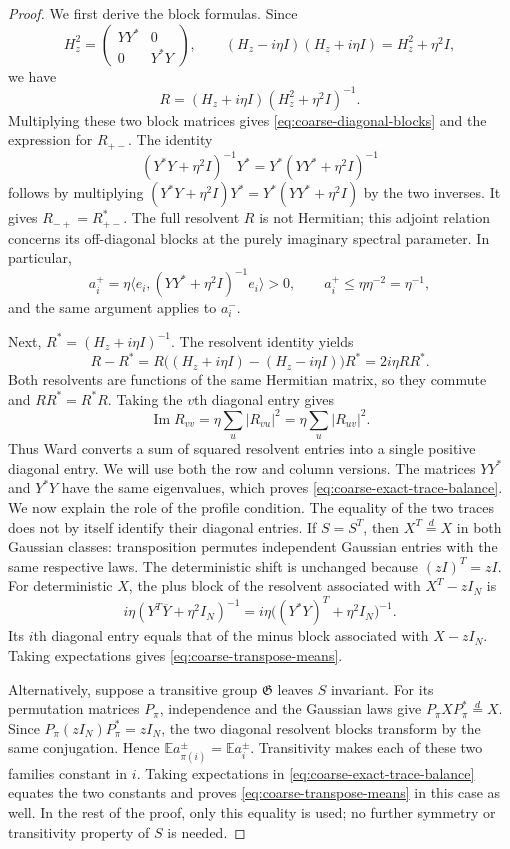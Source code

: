 \documentclass[11pt,reqno]{amsart}
\numberwithin{equation}{section}
\theoremstyle{plain}
\theoremstyle{definition}
\theoremstyle{remark}
\begin{document}
\begin{proof}
We first derive the block formulas. Since
\[
 H_z^2=\begin{pmatrix}YY^*&0\\0&Y^*Y\end{pmatrix},
 \qquad
 (H_z-i\eta I)(H_z+i\eta I)=H_z^2+\eta^2I,
\]
we have
\[
 R=(H_z+i\eta I)(H_z^2+\eta^2I)^{-1}.
\]
Multiplying these two block matrices gives
\eqref{eq:coarse-diagonal-blocks} and the expression for $R_{+-}$.
The identity
\[
 (Y^*Y+\eta^2I)^{-1}Y^*=Y^*(YY^*+\eta^2I)^{-1}
\]
follows by multiplying $(Y^*Y+\eta^2I)Y^*=Y^*(YY^*+\eta^2I)$
by the two inverses. It gives $R_{-+}=R_{+-}^*$.
The full resolvent $R$ is not Hermitian; this adjoint relation concerns
its off-diagonal blocks at the purely imaginary spectral parameter.
In particular,
\[
 a_i^+=\eta\langle e_i,(YY^*+\eta^2I)^{-1}e_i\rangle>0,
 \qquad a_i^+\le\eta\eta^{-2}=\eta^{-1},
\]
and the same argument applies to $a_i^-$.

Next, $R^*=(H_z+i\eta I)^{-1}$. The resolvent identity yields
\[
 R-R^*=R\bigl((H_z+i\eta I)-(H_z-i\eta I)\bigr)R^*
       =2i\eta RR^*.
\]
Both resolvents are functions of the same Hermitian matrix, so they
commute and $RR^*=R^*R$. Taking the $v$th diagonal entry gives
\[
 \operatorname{Im}R_{vv}
 =\eta\sum_u|R_{vu}|^2
 =\eta\sum_u|R_{uv}|^2.
\]
Thus Ward converts a sum of squared resolvent entries into a single
positive diagonal entry. We will use both the row and column versions.  The matrices $YY^*$ and $Y^*Y$ have
the same eigenvalues, which proves \eqref{eq:coarse-exact-trace-balance}.
We now explain the role of the profile condition. The equality of the
two traces does not by itself identify their diagonal entries. If
$S=S^T$, then $X^T\stackrel{d}=X$ in both Gaussian classes: transposition
permutes independent Gaussian entries with the same respective laws.
The deterministic shift is unchanged because $(zI)^T=zI$.
For deterministic $X$, the
plus block of the resolvent associated with $X^T-zI_N$ is
\[
 i\eta(Y^T\overline Y+\eta^2I_N)^{-1}
 =i\eta\bigl((Y^*Y)^T+\eta^2I_N\bigr)^{-1}.
\]
Its $i$th diagonal entry equals that of the minus block associated with
$X-zI_N$.  Taking expectations gives
\eqref{eq:coarse-transpose-means}.

Alternatively, suppose a transitive group $\mathfrak G$ leaves $S$
invariant.  For its permutation matrices $P_\pi$, independence and the
Gaussian laws give $P_\pi XP_\pi^*\stackrel{d}=X$.
Since $P_\pi(zI_N)P_\pi^*=zI_N$, the two diagonal resolvent blocks
transform by the same conjugation.  Hence
$\mathbb E a_{\pi(i)}^\pm=\mathbb E a_i^\pm$.
Transitivity makes each of these two families constant in $i$.
Taking expectations in \eqref{eq:coarse-exact-trace-balance} equates the
two constants and proves \eqref{eq:coarse-transpose-means} in this case
as well.  In the rest of the proof, only this equality is used;
no further symmetry or transitivity property of $S$ is needed.
\end{proof}
\end{document}
